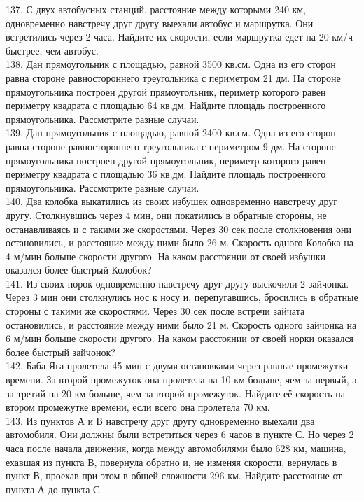 137. С двух автобусных станций, расстояние между которыми 240 км, одновременно навстречу друг другу выехали автобус и маршрутка. Они встретились через 2 часа. Найдите их скорости, если маршрутка едет на 20 км/ч быстрее, чем автобус.\\
138. Дан прямоугольник с площадью, равной 3500 кв.см. Одна из его сторон равна стороне равностороннего треугольника с периметром 21 дм. На стороне прямоугольника построен другой прямоугольник, периметр которого равен периметру квадрата с площадью 64 кв.дм. Найдите площадь построенного прямоугольника. Рассмотрите разные случаи.\\
139. Дан прямоугольник с площадью, равной 2400 кв.см. Одна из его сторон равна стороне равностороннего треугольника с периметром 9 дм. На стороне прямоугольника построен другой прямоугольник, периметр которого равен периметру квадрата с площадью 36 кв.дм. Найдите площадь построенного прямоугольника. Рассмотрите разные случаи.\\
140. Два колобка выкатились из своих избушек одновременно навстречу друг другу. Столкнувшись через 4 мин, они покатились в обратные стороны, не останавливаясь и с такими же скоростями. Через 30 сек после столкновения они остановились, и расстояние между ними было 26 м. Скорость одного Колобка на 4 м/мин больше скорости другого. На каком расстоянии от своей избушки оказался более быстрый Колобок?\\
141. Из своих норок одновременно навстречу друг другу выскочили 2 зайчонка. Через 3 мин они столкнулись нос к носу и, перепугавшись, бросились в обратные стороны с такими же скоростями. Через 30 сек после встречи зайчата остановились, и расстояние между ними было 21 м. Скорость одного зайчонка на 6 м/мин больше скорости другого. На каком расстоянии от своей норки оказался более быстрый зайчонок?\\
142. Баба-Яга пролетела 45 мин с двумя остановками через равные промежутки времени. За второй промежуток она пролетела на 10 км больше, чем за первый, а за третий на 20 км больше, чем за второй промежуток. Найдите её скорость на втором промежутке времени, если всего она пролетела 70 км.\\
143. Из пунктов А и В навстречу друг другу одновременно выехали два автомобиля. Они должны были встретиться через 6 часов в пункте С. Но через 2 часа после начала движения, когда между автомобилями было 628 км, машина, ехавшая из пункта В, повернула обратно и, не изменяя скорости, вернулась в пункт В, проехав при этом в общей сложности 296 км. Найдите расстояние от пункта А до пункта С.\\
